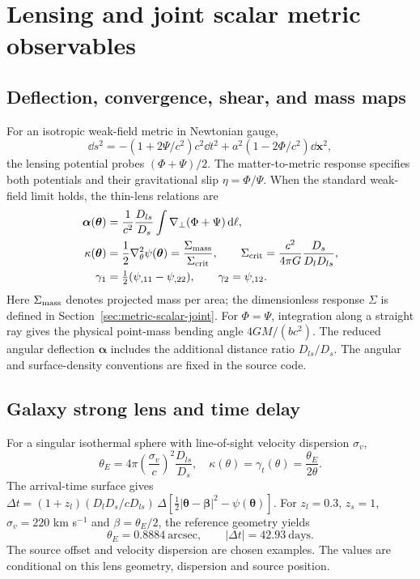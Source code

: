 \section{Lensing and joint scalar metric observables}\label{sec:lensing}

\subsection{Deflection, convergence, shear, and mass maps}
For an isotropic weak-field metric in Newtonian gauge,
\begin{equation}
\dd s^2=-(1+2\Psi/c^2)c^2\dd t^2+a^2(1-2\Phi/c^2)\dd\mathbf x^2,
\end{equation}
the lensing potential probes $(\Phi+\Psi)/2$. The matter-to-metric response specifies both potentials and their gravitational slip $\eta=\Phi/\Psi$. When the standard weak-field limit holds, the thin-lens relations are
\begin{align}
\bm\alpha(\bm\theta)&=\frac{1}{c^2}\frac{D_{ls}}{D_s}\int\nabla_\perp(\Phi+\Psi)\,\mathrm{d}\ell,\\
\kappa(\bm\theta)&=\frac12\nabla_\theta^2\psi(\bm\theta)=\frac{\Sigma_{\rm mass}}{\Sigma_{\rm crit}},\qquad
\Sigma_{\rm crit}=\frac{c^2}{4\pi G}\frac{D_s}{D_lD_{ls}},\\
\gamma_1&=\tfrac12(\psi_{,11}-\psi_{,22}),\qquad \gamma_2=\psi_{,12}.
\end{align}
Here $\Sigma_{\rm mass}$ denotes projected mass per area; the dimensionless response $\Sigma$ is defined in Section~\ref{sec:metric-scalar-joint}. For $\Phi=\Psi$, integration along a straight ray gives the physical point-mass bending angle $4GM/(bc^2)$. The reduced angular deflection $\bm\alpha$ includes the additional distance ratio $D_{ls}/D_s$. The angular and surface-density conventions are fixed in the source code.

\subsection{Galaxy strong lens and time delay}\label{sec:sis}
For a singular isothermal sphere with line-of-sight velocity dispersion $\sigma_v$,
\begin{equation}
\theta_E=4\pi\left(\frac{\sigma_v}{c}\right)^2\frac{D_{ls}}{D_s},\quad
\kappa(\theta)=\gamma_t(\theta)=\frac{\theta_E}{2\theta}.
\end{equation}
The arrival-time surface gives $\Delta t=(1+z_l)(D_lD_s/cD_{ls})\,\Delta[\frac12|\bm\theta-\bm\beta|^2-\psi(\bm\theta)]$. For $z_l=0.3$, $z_s=1$, $\sigma_v=220$ km s$^{-1}$ and $\beta=\theta_E/2$, the reference geometry yields
\begin{equation}
\boxed{\theta_E=0.8884\ \mathrm{arcsec},\qquad |\Delta t|=42.93\ \mathrm{days}.}
\end{equation}
The source offset and velocity dispersion are chosen examples. The values are conditional on this lens geometry, dispersion and source position.

